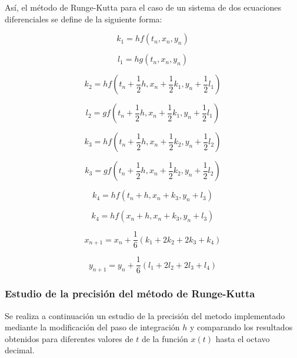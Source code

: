 \documentclass[11pt]{article}
\begin{document}
Así, el método de Runge-Kutta para el caso de un sistema de dos ecuaciones
diferenciales se define de la siguiente forma:

\begin{equation}
	k_1 = hf(t_n, x_n, y_n)
\end{equation}

\begin{equation}
	l_1 = hg(t_n, x_n, y_n)
\end{equation}

\begin{equation}
	k_2 = hf(t_n + \frac{1}{2}h, x_n + \frac{1}{2}k_1, y_n + \frac{1}{2}l_1)
\end{equation}

\begin{equation}
	l_2 = gf(t_n + \frac{1}{2}h, x_n + \frac{1}{2}k_1, y_n + \frac{1}{2}l_1)
\end{equation}

\begin{equation}
	k_3 = hf(t_n + \frac{1}{2}h, x_n + \frac{1}{2}k_2, y_n + \frac{1}{2}l_2)
\end{equation}

\begin{equation}
	k_3 = gf(t_n + \frac{1}{2}h, x_n + \frac{1}{2}k_2, y_n + \frac{1}{2}l_2)
\end{equation}

\begin{equation}
	k_4 = hf(t_n + h, x_n + k_3, y_n + l_3)
\end{equation}

\begin{equation}
	k_4 = hf(x_n + h, x_n + k_3, y_n + l_3)
\end{equation} 

\begin{equation}
	x_{n+1} = x_n + \frac{1}{6}(k_1 + 2k_2 + 2k_3 + k_4)
\end{equation}

\begin{equation}
	y_{n+1} = y_n + \frac{1}{6}(l_1 + 2l_2 + 2l_3 + l_4)
\end{equation}

\subsubsection{Estudio de la precisión del método de Runge-Kutta}
\label{precision-runge-kutta}
Se realiza a continuación un estudio de la precisión del metodo implementado
mediante la modificación del paso de integración $h$ y comparando los resultados
obtenidos para diferentes valores de $t$ de la función $x(t)$ hasta el octavo
decimal. 
\end{document}
